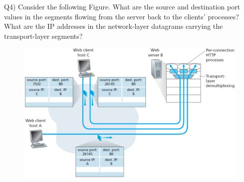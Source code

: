 \documentclass[10pt,letterpaper]{article}
\begin{document}
Q4) Consider the following Figure. What are the source and destination port values in the segments
flowing from the server back to the clients’ processes? What are the IP
addresses in the network-layer datagrams carrying the transport-layer segments?
\begin{figure}[ht]
\centering
\includegraphics[width=180mm]{simnet}
\end{figure}
\end{document}
